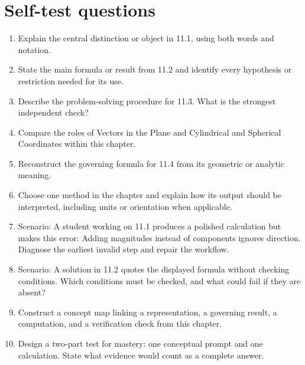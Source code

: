 \documentclass[11pt]{article}
\begin{document}
\section{Self-test questions}
\begin{enumerate}
\item Explain the central distinction or object in 11.1, using both words and notation.
\item State the main formula or result from 11.2 and identify every hypothesis or restriction needed for its use.
\item Describe the problem-solving procedure for 11.3. What is the strongest independent check?
\item Compare the roles of Vectors in the Plane and Cylindrical and Spherical Coordinates within this chapter.
\item Reconstruct the governing formula for 11.4 from its geometric or analytic meaning.
\item Choose one method in the chapter and explain how its output should be interpreted, including units or orientation when applicable.
\item Scenario: A student working on 11.1 produces a polished calculation but makes this error: Adding magnitudes instead of components ignores direction. Diagnose the earliest invalid step and repair the workflow.
\item Scenario: A solution in 11.2 quotes the displayed formula without checking conditions. Which conditions must be checked, and what could fail if they are absent?
\item Construct a concept map linking a representation, a governing result, a computation, and a verification check from this chapter.
\item Design a two-part test for mastery: one conceptual prompt and one calculation. State what evidence would count as a complete answer.
\end{enumerate}

\end{document}
